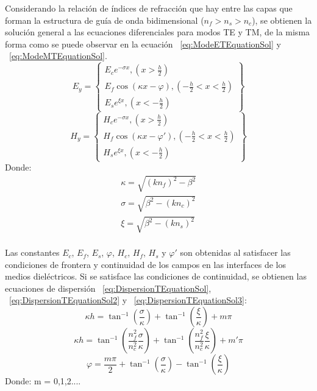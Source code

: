 \documentclass[letterpaper, 10 pt, conference]{ieeeconf}  %
\begin{document}
Considerando la relaci\'on de \'indices de refracci\'on que hay entre las capas que forman la estructura de gu\'ia de onda bidimensional (\(n_f\)\(>\)\(n_s\)\(>\)\(n_c\)), se obtienen la soluci\'on general a las ecuaciones diferenciales para modos TE y TM, de la misma forma como se puede observar en la ecuaci\'on ~\eqref{eq:ModeETEquationSol} y ~\eqref{eq:ModeMTEquationSol}.
\begin{equation}
\label{eq:ModeETEquationSol}
{
{E_y} = \left\{ {\begin{array}{*{20}{c}}
{{E_c}{e^{ - \sigma x}},(x > \frac{h}{2})}\\
{{E_f}\cos (\kappa x - \varphi ),( - \frac{h}{2} < x < \frac{h}{2})}\\
{{E_s}{e^{\xi x}},(x <  - \frac{h}{2})}
\end{array}} \right\}
}
\end{equation}
\begin{equation}
\label{eq:ModeMTEquationSol}
{
{H_y} = \left\{ {\begin{array}{*{20}{c}}
{{H_c}{e^{ - \sigma x}},(x > \frac{h}{2})}\\
{{H_f}\cos (\kappa x - {\varphi'}),( - \frac{h}{2} < x < \frac{h}{2})}\\
{{H_s}{e^{\xi x}},(x <  - \frac{h}{2})}
\end{array}} \right\}
}
\end{equation}
Donde:
\[\begin{array}{l}
\kappa  = \sqrt {{{(k{n_f})}^2} - {\beta ^2}} \\
\sigma  = \sqrt {{\beta ^2} - {{(k{n_c})}^2}} \\
\xi  = \sqrt {{\beta ^2} - {{(k{n_s})}^2}} 
\end{array}\]
\\
Las constantes \(E_c\), \(E_f\), \(E_s\), \(\varphi\), \(H_c\), \(H_f\), \(H_s\) y \(\varphi'\) son obtenidas al satisfacer las condiciones de frontera y continuidad de los campos en las interfaces de los medios diel\'ectricos. Si se satisface las condiciones de continuidad, se obtienen las ecuaciones de dispersi\'on ~\eqref{eq:DispersionTEquationSol}, ~\eqref{eq:DispersionTEquationSol2} y ~\eqref{eq:DispersionTEquationSol3}:
\\
\begin{equation}
\label{eq:DispersionTEquationSol}
{
\kappa h = {\tan ^{ - 1}}(\frac{\sigma }{\kappa }) + {\tan ^{ - 1}}(\frac{\xi }{\kappa }) + m\pi
}
\end{equation}
\begin{equation}
\label{eq:DispersionTEquationSol2}
{
\kappa h = {\tan ^{ - 1}}(\frac{{n_f^2}}{{n_c^2}}\frac{\sigma }{\kappa }) + {\tan ^{ - 1}}(\frac{{n_f^2}}{{n_c^2}}\frac{\xi }{\kappa }) + m'\pi
}
\end{equation}
\begin{equation}
\label{eq:DispersionTEquationSol3}
\varphi  = \frac{{m\pi }}{2} + {\tan ^{ - 1}}(\frac{\sigma }{\kappa }) - {\tan ^{ - 1}}(\frac{\xi }{\kappa })
\end{equation}
Donde:
m = 0,1,2....
\end{document}
